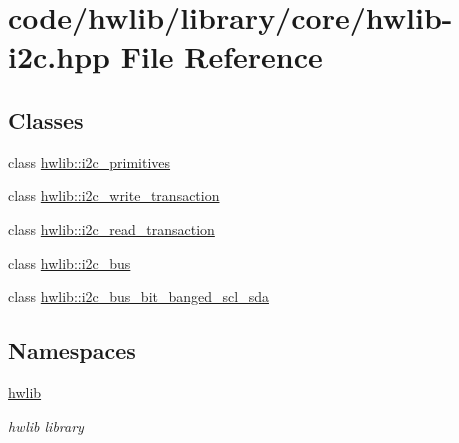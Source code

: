 \hypertarget{hwlib-i2c_8hpp}{}\section{code/hwlib/library/core/hwlib-\/i2c.hpp File Reference}
\label{hwlib-i2c_8hpp}
\subsection*{Classes}
\begin{DoxyCompactItemize}
\item 
class \hyperlink{classhwlib_1_1i2c__primitives}{hwlib\+::i2c\+\_\+primitives}
\item 
class \hyperlink{classhwlib_1_1i2c__write__transaction}{hwlib\+::i2c\+\_\+write\+\_\+transaction}
\item 
class \hyperlink{classhwlib_1_1i2c__read__transaction}{hwlib\+::i2c\+\_\+read\+\_\+transaction}
\item 
class \hyperlink{classhwlib_1_1i2c__bus}{hwlib\+::i2c\+\_\+bus}
\item 
class \hyperlink{classhwlib_1_1i2c__bus__bit__banged__scl__sda}{hwlib\+::i2c\+\_\+bus\+\_\+bit\+\_\+banged\+\_\+scl\+\_\+sda}
\end{DoxyCompactItemize}
\subsection*{Namespaces}
\begin{DoxyCompactItemize}
\item 
 \hyperlink{namespacehwlib}{hwlib}
\begin{DoxyCompactList}\small\item\em hwlib library \end{DoxyCompactList}\end{DoxyCompactItemize}
